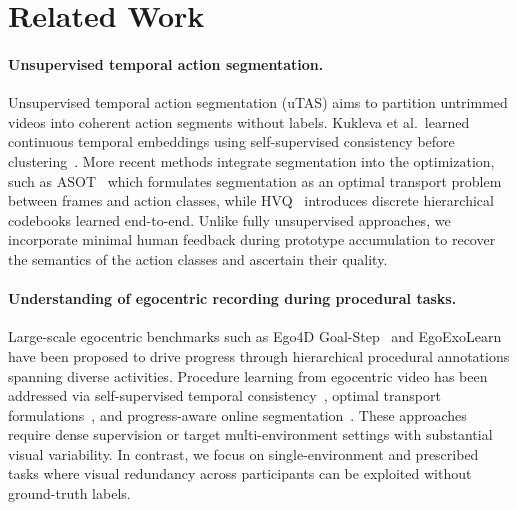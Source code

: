 \documentclass[runningheads]{llncs}
\begin{document}

\vspace{-0.25cm}
\section{Related Work}
\label{sec:related_work}

\paragraph{Unsupervised temporal action segmentation.}
Unsupervised temporal action segmentation (uTAS) aims to partition untrimmed videos into coherent action segments without labels. Kukleva et al.\ learned continuous temporal embeddings using self-supervised consistency before clustering~\cite{kukleva2019unsupervised}. More recent methods integrate segmentation into the optimization, such as ASOT~\cite{Xu_2024_CVPR} which formulates segmentation as an optimal transport problem between frames and action classes, while HVQ~\cite{wang2025hvq} introduces discrete hierarchical codebooks learned end-to-end. Unlike fully unsupervised approaches, we incorporate minimal human feedback during prototype accumulation to recover the semantics of the action classes and ascertain their quality.

\paragraph{Understanding of egocentric recording during procedural tasks.}
Large-scale egocentric benchmarks such as Ego4D Goal-Step~\cite{song2023goalstep} and EgoExoLearn~\cite{huang2024egoexolearn} have been proposed to drive progress through hierarchical procedural annotations spanning diverse activities. Procedure learning from egocentric video has been addressed via self-supervised temporal consistency~\cite{10.1007/978-3-031-19778-9_38}, optimal transport formulations~\cite{Mahmood2025ProcedureLV}, and progress-aware online segmentation~\cite{shen2024protas}. These approaches require dense supervision or target multi-environment settings with substantial visual variability. In contrast, we focus on single-environment and prescribed tasks where visual redundancy across participants can be exploited without ground-truth labels.
\end{document}
